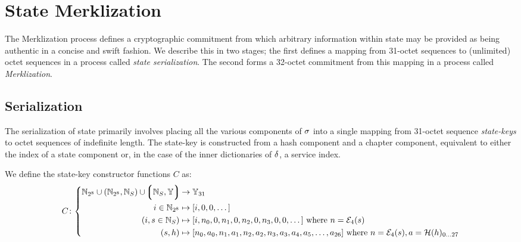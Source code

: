 \section{State Merklization}\label{sec:statemerklization}

The Merklization process defines a cryptographic commitment from which arbitrary information within state may be provided as being authentic in a concise and swift fashion. We describe this in two stages; the first defines a mapping from 31-octet sequences to (unlimited) octet sequences in a process called \emph{state serialization}. The second forms a 32-octet commitment from this mapping in a process called \emph{Merklization}.

\subsection{Serialization}

The serialization of state primarily involves placing all the various components of $\sigma$ into a single mapping from 31-octet sequence \emph{state-keys} to octet sequences of indefinite length. The state-key is constructed from a hash component and a chapter component, equivalent to either the index of a state component or, in the case of the inner dictionaries of $\delta$, a service index.

We define the state-key constructor functions $C$ as:
\begin{equation}
  C\colon\left\{\begin{aligned}
    \N_{2^8} \cup (\N_{2^8}, \serviceid) \cup \tup{\serviceid, \blob} &\to \blob_{31} \\
    i \in \N_{2^8} &\mapsto [i, 0, 0, \dots] \\
    (i, s \in \serviceid) &\mapsto [i, n_0, 0, n_1, 0, n_2, 0, n_3, 0, 0, \dots]\ \where n = \se_4(s) \\
    (s, h) &\mapsto [n_0, a_0, n_1, a_1, n_2, a_2, n_3, a_3, a_4, a_5, \dots, a_{26}]\ \where n = \se_4(s), a = \blake(h)_{0\dots 27}
  \end{aligned}
  \right.
\end{equation}

